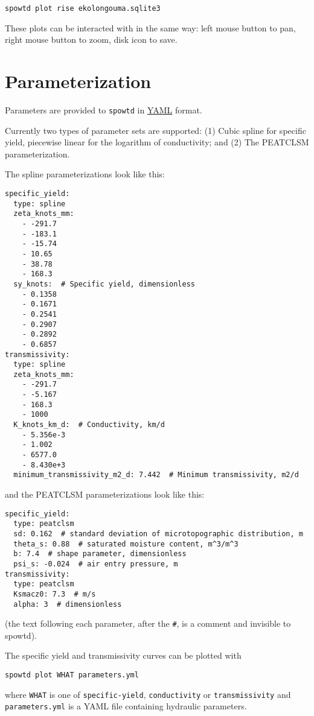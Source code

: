 \documentclass[11pt,a4paper]{article}
\begin{document}
\begin{lstlisting}[frame=single]
spowtd plot rise ekolongouma.sqlite3
\end{lstlisting}
These plots can be interacted with in the same way: left mouse button
to pan, right mouse button to zoom, disk icon to save.

\section{Parameterization}
Parameters are provided to \texttt{spowtd} in
\href{https://yaml.org/}{YAML} format.

Currently two types of parameter sets are supported: (1) Cubic spline
for specific yield, piecewise linear for the logarithm of
conductivity; and (2) The PEATCLSM parameterization.

The spline parameterizations look like this:
\begin{lstlisting}[frame=single]
specific_yield:
  type: spline
  zeta_knots_mm:
    - -291.7
    - -183.1
    - -15.74
    - 10.65
    - 38.78
    - 168.3
  sy_knots:  # Specific yield, dimensionless
    - 0.1358
    - 0.1671
    - 0.2541
    - 0.2907
    - 0.2892
    - 0.6857
transmissivity:
  type: spline
  zeta_knots_mm:
    - -291.7
    - -5.167
    - 168.3
    - 1000
  K_knots_km_d:  # Conductivity, km/d
    - 5.356e-3
    - 1.002
    - 6577.0
    - 8.430e+3
  minimum_transmissivity_m2_d: 7.442  # Minimum transmissivity, m2/d
\end{lstlisting}
and the PEATCLSM parameterizations look like this:
\begin{lstlisting}[frame=single]
specific_yield:
  type: peatclsm
  sd: 0.162  # standard deviation of microtopographic distribution, m
  theta_s: 0.88  # saturated moisture content, m^3/m^3
  b: 7.4  # shape parameter, dimensionless
  psi_s: -0.024  # air entry pressure, m
transmissivity:
  type: peatclsm
  Ksmacz0: 7.3  # m/s
  alpha: 3  # dimensionless
\end{lstlisting}
(the text following each parameter, after the \verb|#|, is a comment
and invisible to spowtd).

The specific yield and transmissivity curves can be plotted with
\begin{lstlisting}[frame=single]
  spowtd plot WHAT parameters.yml
\end{lstlisting}
where \texttt{WHAT} is one of \texttt{specific-yield},
\texttt{conductivity} or \texttt{transmissivity} and
\texttt{parameters.yml} is a YAML file containing hydraulic
parameters.
\end{document}
